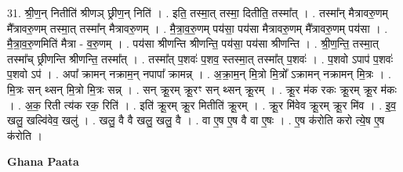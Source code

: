 \documentclass[17pt]{extarticle}
\begin{document}
31. श्री॒ण॒न् नितीति॑ श्रीणञ् छ्रीण॒न् निति॑ । . इति॒ तस्मा॒त् तस्मा॒ दितीति॒ तस्मा᳚त् । . तस्मा᳚न् मैत्रावरु॒णम् मै᳚त्रावरु॒णम् तस्मा॒त् तस्मा᳚न् मैत्रावरु॒णम् । . मै॒त्रा॒व॒रु॒णम् पय॑सा॒ पय॑सा मैत्रावरु॒णम् मै᳚त्रावरु॒णम् पय॑सा । . मै॒त्रा॒व॒रु॒णमिति॑ मैत्रा - व॒रु॒णम् । . पय॑सा श्रीणन्ति श्रीणन्ति॒ पय॑सा॒ पय॑सा श्रीणन्ति । . श्री॒ण॒न्ति॒ तस्मा॒त् तस्मा᳚च् छ्रीणन्ति श्रीणन्ति॒ तस्मा᳚त् । . तस्मा᳚त् प॒शवः॑ प॒शव॒ स्तस्मा॒त् तस्मा᳚त् प॒शवः॑ । . प॒शवो ऽपाप॑ प॒शवः॑ प॒शवो ऽप॑ । . अपा᳚ क्रामन् नक्राम॒न् नपापा᳚ क्रामन्न् । . अ॒क्रा॒म॒न् मि॒त्रो मि॒त्रो᳚ ऽक्रामन् नक्रामन् मि॒त्रः । . मि॒त्रः सन् थ्सन् मि॒त्रो मि॒त्रः सन्न् । . सन् क्रू॒रम् क्रू॒रꣳ सन् थ्सन् क्रू॒रम् । . क्रू॒र म॑क रकः क्रू॒रम् क्रू॒र म॑कः । . अ॒क॒ रिती त्य॑क रक॒ रिति॑ । . इति॑ क्रू॒रम् क्रू॒र मितीति॑ क्रू॒रम् । . क्रू॒र मि॑वेव क्रू॒रम् क्रू॒र मि॑व । . इ॒व॒ खलु॒ खल्वि॑वेव॒ खलु॑ । . खलु॒ वै वै खलु॒ खलु॒ वै । . वा ए॒ष ए॒ष वै वा ए॒षः । . ए॒ष क॑रोति करो त्ये॒ष ए॒ष क॑रोति । \newline

\textbf{Ghana Paata } \newline
\end{document}

